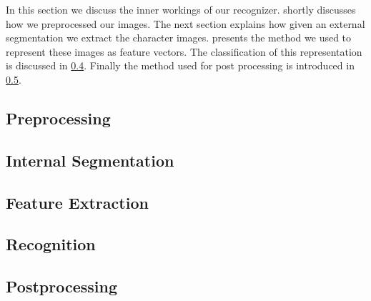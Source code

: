 In this section we discuss the inner workings of our recognizer.  shortly discusses how we preprocessed our images. The next section explains how given an external segmentation we extract the character images.  presents the method we used to represent these images as feature vectors. The classification of this representation is discussed in \cref{ss:methods:recognition}. Finally the method used for post processing is introduced in \cref{ss:methods:postprocessing}.

\subsection{Preprocessing}
\label{ss:methods:preprocessing}


\subsection{Internal Segmentation}
\label{ss:methods:characterSegmentation}


\subsection{Feature Extraction}
\label{ss:methods:featureExtraction}


\subsection{Recognition}
\label{ss:methods:recognition}


\subsection{Postprocessing}
\label{ss:methods:postprocessing}



